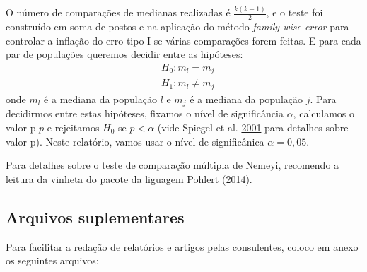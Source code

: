\documentclass[]{article}
\begin{document}
O número de comparações de medianas realizadas é \(\frac{k(k-1)}{2}\), e o teste foi construído em soma de postos e na aplicação do método \emph{family-wise-error} para controlar a inflação do erro tipo I se várias comparações forem feitas. E para cada par de populações queremos decidir entre as hipóteses:
\[
\begin{split}
&H_0: m_l = m_j\\
&H_1: m_l \neq m_j
\end{split}
\]
onde \(m_l\) é a mediana da população \(l\) e \(m_j\) é a mediana da população \(j\). Para decidirmos entre estas hipóteses, fixamos o nível de significância \(\alpha\), calculamos o valor-p \(p\) e rejeitamos \(H_0\) se \(p < \alpha\) (vide Spiegel et al. \protect\hyperlink{ref-spiegel2001probability}{2001} para detalhes sobre valor-p). Neste relatório, vamos usar o nível de significânica \(\alpha=0,05\).

Para detalhes sobre o teste de comparação múltipla de Nemeyi, recomendo a leitura da vinheta do pacote da liguagem Pohlert (\protect\hyperlink{ref-PMCMR}{2014}).

\hypertarget{arquivos-suplementares}{%
\subsection{Arquivos suplementares}\label{arquivos-suplementares}}

Para facilitar a redação de relatórios e artigos pelas consulentes, coloco em anexo os seguintes arquivos:
\end{document}
